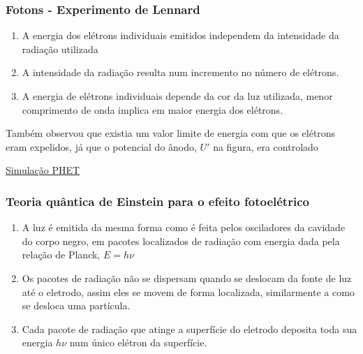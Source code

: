 \documentclass[12pt,brazil]{beamer}
\begin{document}

\begin{frame}
  \frametitle{Fotons - Experimento de Lennard}
        \fontsize{11pt}{11pt}\selectfont
  
        \vspace*{-0.5cm}
  \begin{enumerate}
   \item A energia dos elétrons individuais emitidos independem da intensidade da radiação utilizada
   \item A intensidade da radiação resulta num incremento no número de elétrons.
   \item A energia de elétrons individuais depende da cor da luz utilizada, menor comprimento de onda implica em maior energia dos elétrons. 
  \end{enumerate}
        \vspace*{0.5cm}
  
  Também observou que existia um valor limite de energia com que os elétrons eram expelidos, já que o potencial do ânodo, $U'$ na figura, era controlado

        \vspace*{0.5cm}
  
        \href{https://phet.colorado.edu/sims/cheerpj/photoelectric/latest/photoelectric.html?simulation=photoelectric&locale=pt}{\color{blue} Simulação PHET}
\end{frame}



\begin{frame}
  \frametitle{Teoria quântica de Einstein para o efeito fotoelétrico}
        \fontsize{11pt}{11pt}\selectfont
  
        \vspace*{-0.5cm}
  \begin{enumerate}
   \item A luz é emitida da mesma forma como é feita pelos osciladores da cavidade do corpo negro, em pacotes localizados de radiação com energia dada pela relação de Planck, $E=h\nu$
   \item Os pacotes de radiação não se dispersam quando se deslocam da fonte de luz até o eletrodo, assim eles se movem de forma localizada, similarmente a como se desloca uma partícula.
   \item Cada pacote de radiação que atinge a superfície do eletrodo deposita toda sua energia $h\nu$ num único elétron da superfície. 
  \end{enumerate}
\end{frame}
\end{document}
